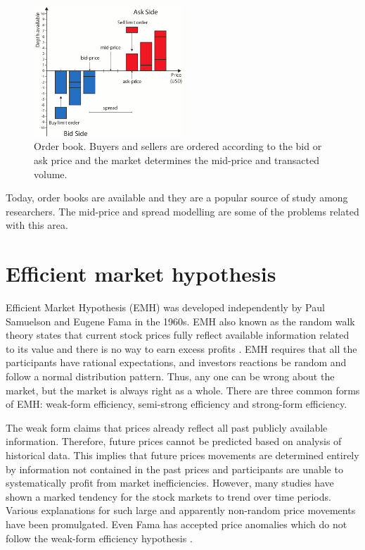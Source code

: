 \begin{figure}[!h]
  \centering
  \includegraphics[width=0.5\textwidth]{img/orderbook}
  \caption{Order book. Buyers and sellers are ordered according to the bid or
  ask price and the market determines the mid-price and transacted volume.}
  \label{fig:orderbook}
\end{figure}
Today, order books are available and they are a popular source of study among
researchers. The mid-price and spread modelling are some of the
problems related with this area. 


\section{Efficient market hypothesis}

Efficient Market Hypothesis (EMH) was developed independently by  Paul Samuelson and Eugene Fama in the 1960s.
EMH also known as the random walk theory states that current stock prices fully reflect available information related to its value and there is no way to earn excess profits
\cite{fama1970}. EMH requires that all the participants have rational expectations, and investors reactions be random and follow a normal distribution pattern. Thus, any one can be wrong about the market, but the market is always right as a whole.
There are three common forms of EMH: weak-form efficiency, semi-strong efficiency and strong-form efficiency.

The weak form claims that prices already reflect all past publicly available information. Therefore, future prices cannot be predicted based on analysis of historical data. This implies that future prices movements are determined entirely by information not contained in the past prices and participants are unable to systematically profit from market inefficiencies. 
However, many studies have shown a marked tendency for the stock markets to trend over time periods. Various explanations for such large and apparently non-random price movements have been promulgated. Even Fama has accepted price anomalies which do not follow the weak-form efficiency hypothesis \cite{fama+french2008}.

